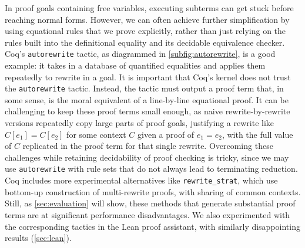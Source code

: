 In proof goals containing free variables, executing subterms can get stuck before reaching normal forms.
However, we can often achieve further simplification by using equational rules that we prove explicitly, rather than just relying on the rules built into the definitional equality and its decidable equivalence checker.
Coq's \texttt{autorewrite} tactic, as diagrammed in \autoref{subfig:autorewrite}, is a good example: it takes in a database of quantified equalities and applies them repeatedly to rewrite in a goal.
It is important that Coq's kernel does not trust the \texttt{autorewrite} tactic.
Instead, the tactic must output a proof term that, in some sense, is the moral equivalent of a line-by-line equational proof.
It can be challenging to keep these proof terms small enough, as naive rewrite-by-rewrite versions repeatedly copy large parts of proof goals, justifying a rewrite like $C[e_1] = C[e_2]$ for some context $C$ given a proof of $e_1 = e_2$, with the full value of $C$ replicated in the proof term for that single rewrite.
Overcoming these challenges while retaining decidability of proof checking is tricky, since we may use \texttt{autorewrite} with rule sets that do not always lead to terminating reduction.
Coq includes more experimental alternatives like \texttt{rewrite\_strat}, which use bottom-up construction of multi-rewrite proofs, with sharing of common contexts.
Still, as \autoref{sec:evaluation} will show, these methods that generate substantial proof terms are at significant performance disadvantages.
We also experimented with the corresponding tactics in the Lean proof assistant, with similarly disappointing results (\autoref{sec:lean}).

